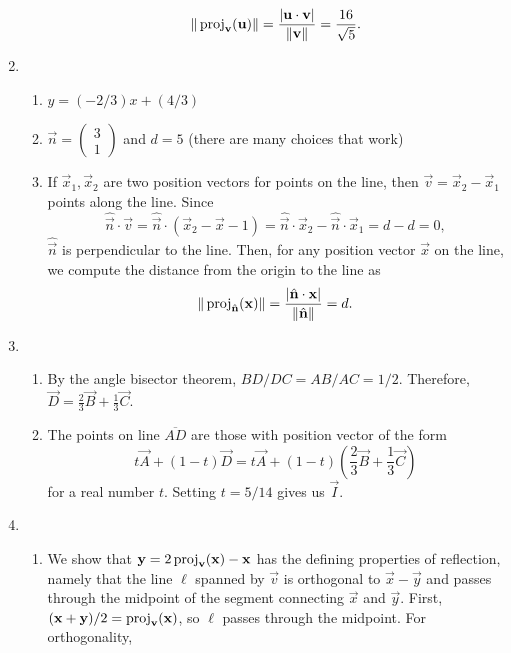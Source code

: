 \begin{enumerate}
\begin{enumerate}
\begin{equation*}
\|\operatorname{proj}_{\mathbf{v}}(\mathbf{u})\| = \frac{\lvert\mathbf{u}\cdot\mathbf{v}\rvert}{\|\mathbf{v}\|} = \frac{16}{\sqrt{5}}.
\end{equation*}
\end{enumerate}
\item \begin{enumerate}
\item $y = (-2/3)x + (4/3)$
\item $\vec{n} = \begin{pmatrix} 3 \\ 1 \end{pmatrix}$ and $d = 5$ (there are many choices that work)
\item If $\vec{x}_1,\vec{x}_2$ are two position vectors for points on the line, then $\vec{v} = \vec{x}_2 - \vec{x}_1$ points along the line. Since
\begin{equation*}
\hat{\vec{n}}\cdot\vec{v} = \hat{\vec{n}}\cdot (\vec{x}_2 - \vec{x}-1) = \hat{\vec{n}}\cdot\vec{x}_2 - \hat{\vec{n}}\cdot\vec{x}_1 = d - d = 0,
\end{equation*}
$\hat{\vec{n}}$ is perpendicular to the line. Then, for any position vector $\vec{x}$ on the line, we compute the distance from the origin to the line as
\begin{equation*}
\|\operatorname{proj}_{\hat{\mathbf{n}}}(\mathbf{x})\| = \frac{\lvert\hat{\mathbf{n}}\cdot\mathbf{x}\rvert}{\|\hat{\mathbf{n}}\|} = d.
\end{equation*}
\end{enumerate}
\item \begin{enumerate}
\item By the angle bisector theorem, $BD/DC = AB/AC = 1/2$. Therefore, $\vec{D} = \frac{2}{3}\vec{B} + \frac{1}{3}\vec{C}$.
\item The points on line $\overline{AD}$ are those with position vector of the form
\begin{equation*}
t\vec{A} + (1 - t)\vec{D} = t\vec{A} + (1 - t)\left(\frac{2}{3}\vec{B} + \frac{1}{3}\vec{C}\right)
\end{equation*}
for a real number $t$. Setting $t = 5/14$ gives us $\vec{I}$.
\end{enumerate}
\item \begin{enumerate}
\item We show that $\mathbf{y} = 2\operatorname{proj}_{\mathbf{v}}(\mathbf{x}) - \mathbf{x}$ has the defining properties of reflection, namely that the line $\ell$ spanned by $\vec{v}$ is orthogonal to $\vec{x} - \vec{y}$ and passes through the midpoint of the segment connecting $\vec{x}$ and $\vec{y}$. First, $(\mathbf{x} + \mathbf{y})/2 = \operatorname{proj}_{\mathbf{v}}(\mathbf{x})$, so $\ell$ passes through the midpoint. For orthogonality,

\end{enumerate}
\end{enumerate}
